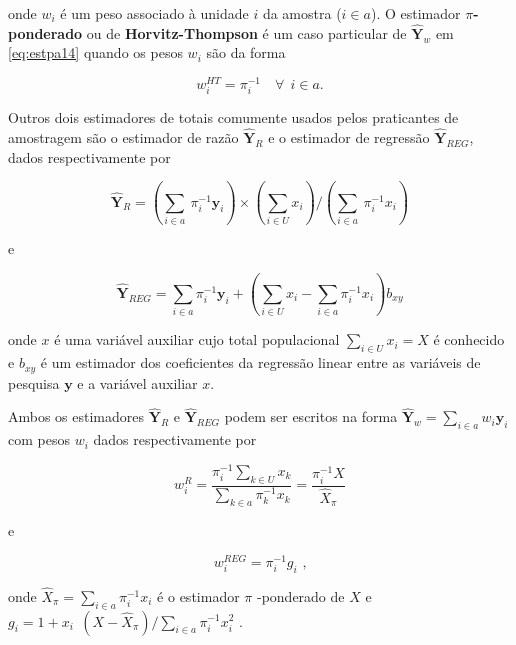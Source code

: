 \documentclass[]{book}
\theoremstyle{definition}
\theoremstyle{definition}
\theoremstyle{definition}
\theoremstyle{remark}
\begin{document}
onde \(w_i\) é um peso associado à unidade \(i\) da amostra
(\(i \in a\)). O estimador \(\pi\)\textbf{-ponderado} ou de
\textbf{Horvitz-Thompson} é um caso particular de \(\mathbf{\hat{Y}}_w\)
em \eqref{eq:estpa14} quando os pesos \(w_i\) são da forma

\[
w_i^{HT} = \pi_i ^{-1} \quad \forall \ \ i \in a. 
\]

Outros dois estimadores de totais comumente usados pelos praticantes de
amostragem são o estimador de razão \(\mathbf{\hat{Y}}_R\) e o estimador
de regressão \(\mathbf{\hat{Y}}_{REG}\), dados respectivamente por

\begin{equation}
\mathbf{\hat{Y}}_R = \left( \sum_{i \in a} {\ \pi_i^{-1}} \mathbf{y}_i \right) \times \left( \sum_{i \in U}x_i \right) / \left( \sum_{i \in a} {\ \pi_i^{-1}} x_i \right)  \label{eq:estpa15}
\end{equation}

e

\begin{equation}
\mathbf{\hat{Y}}_{REG} = \sum\limits_{i \in a} {\pi_i^{-1}} \mathbf{y}_i + \left( \sum\limits_{i \in U} x_i - \sum\limits_{i \in a} {\pi_i^{-1}} x_i \right) b_{xy}  \label{eq:estpa16}
\end{equation}

onde \(x\) é uma variável auxiliar cujo total populacional
\(\sum_{i \in U} x_i = X\) é conhecido e \(b_{xy}\) é um estimador dos
coeficientes da regressão linear entre as variáveis de pesquisa
\(\mathbf{y}\) e a variável auxiliar \(x\).

Ambos os estimadores \(\mathbf{\hat{Y}}_R\) e \(\mathbf{\hat{Y}}_{REG}\)
podem ser escritos na forma
\(\mathbf{\hat{Y}}_w = \sum\limits_{i \in a} w_i \mathbf{y}_i\) com
pesos \(w_i\) dados respectivamente por

\begin{equation}
w_i^R = \frac{\pi_i^{-1} \sum_{k \in U} x_k} {\sum\limits_{k \in a} \pi_k^{-1} x_k} = \frac{\pi_i^{-1} X} {\widehat{X}_{\pi}} \label{eq:estpa17} 
\end{equation}

e

\begin{equation}
w_i^{REG} = \pi_i^{-1} g_i \mbox{ ,} \label{eq:estpa18}
\end{equation}

onde \(\widehat{X}_{\pi} = \sum\limits_{i \in a} \pi_i^{-1} x_i\) é o
estimador \(\pi\) -ponderado de \(X\) e
\(g_{i} = 1 + x_{i \mbox{ }} (X - \widehat{X}_{\pi}) / \sum_{i \in a} \pi_i^{-1} x_i^2\)
.
\end{document}
